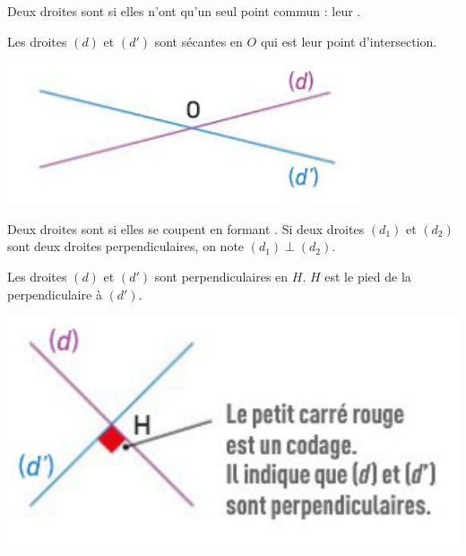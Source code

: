 \begin{mydef}
	Deux droites sont  si elles n'ont qu'un seul point commun : leur .
\end{mydef}


\begin{myex}
	\begin{multicols}{2}
		Les droites $(d)$ et $(d')$ sont sécantes en $O$ qui est leur point d'intersection.
		
		\includegraphics[scale=0.5]{img/sec}
	\end{multicols}
	
\end{myex}

\begin{mydef}
	Deux droites sont  si elles se coupent en formant . Si deux droites $(d_1)$ et $(d_2)$ sont deux droites perpendiculaires, on note $(d_1) \perp (d_2)$.
\end{mydef}

\begin{myex}
	\begin{multicols}{2}
		Les droites $(d)$ et $(d')$ sont perpendiculaires en $H$. $H$ est le pied de la perpendiculaire à $(d')$.
		
		\includegraphics[scale=0.6]{img/perp}
	\end{multicols}
	
\end{myex}

